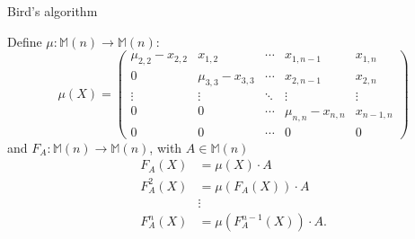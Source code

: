 \documentclass{beamer}
\begin{document}
\begin{frame}{Bird's algorithm}

    Define $\mu : \mathbb{M}(n) \to \mathbb{M}(n)$:
    \[
        \mu(X) =
        \begin{pmatrix}{}
            \mu_{2,2} - x_{2,2} & x_{1,2}             & \cdots & x_{1,n-1}           & x_{1,n} \\
            0                   & \mu_{3,3} - x_{3,3} & \cdots & x_{2,n-1}           & x_{2,n} \\
            \vdots              & \vdots              & \ddots & \vdots              & \vdots \\
            0                   & 0                   & \cdots & \mu_{n,n} - x_{n,n} & x_{n-1,n} \\
            0                   & 0                   & \cdots & 0                   & 0
        \end{pmatrix}
    \]
    and $F_A : \mathbb{M}(n) \to \mathbb{M}(n)$,
    with $A \in \mathbb{M}(n)$
    \begin{align*}{}
        F_A(X)    & = \mu(X)\cdot A \\
        F_A^2(X)  & = \mu(F_A(X)) \cdot A \\
                  & \vdots \\
        F_A^n(X)  & = \mu(F_A^{n-1}(X)) \cdot A. \\
    \end{align*}

\end{frame}
\end{document}
